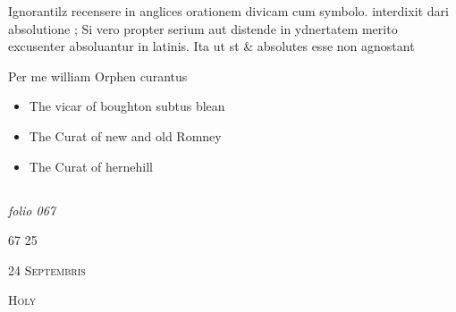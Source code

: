 \documentclass[12pt, a4paper]{book}
\begin{document}
 		
 			
				\marginpar[\vspace{0.5cm}{\textcolor{Gray}{6}}]{}
			
 			
		\ifthenelse{\isodd{\thepage}}
		{\reversemarginpar}
		{\normalmarginpar}
		Ignorantilz recensere in anglices orationem divicam cum symbolo. interdixit dari absolutione ; Si vero  propter serium aut distende in ydnertatem merito excusenter absoluantur in latinis. Ita ut st \& absolutes esse non agnostant
 		
 		
		\ifthenelse{\isodd{\thepage}}
		{\reversemarginpar}
		{\normalmarginpar}
		Per me william Orphen curantus
 		
 			\begin{itemize}
 			\item[]The vicar of boughton subtus blean
 				\item[]The Curat of new and old Romney
 				\item[]The Curat of hernehill
 		\end{itemize}
 		


            
\dotfill
						\newpage {} \subsection*{}

\textit{folio 067}


		
			\begin{flushright}
				{\color{Mahogany}67}
				25
			\end{flushright}
		
 
		
		               
				\begin{center} \begin{large} {\scshape 
		                  24 Septembris
		               } \end{large} \end{center}
			
		               
		                  
				\begin{center}  {\scshape Holy}  \end{center}
			
		               	
		               		
			
\end{document}
